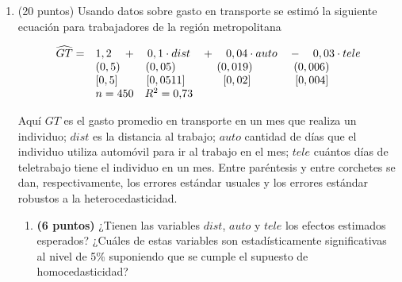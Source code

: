 \documentclass[10pt,a4paper]{article}
\begin{document}
\begin{enumerate}
\begin{enumerate}
   donde L(pib,1) representa el rezago de orden 1 del PIB. Utilizando estos resultados y los valores críticos apropiados del test Dickey--Fuller al 5\% de significancia, determine si existe raíz unitaria en el PIB real de Chile. 


{\color{blue}  El valor del estadístico t para el rezago del PIB real es:

$$t_{DF}={-0.5208\over 0.1777}=-2.931$$ 

Considerando que se cuenta con 25 observaciones, el valor crítico de la tabla al 5\% y con tendencia es -3.6. Luego, como 2.931<3.6, no se rechaza la hipótesis nula. El PIB real presenta una raíz unitaria.   }

   
\end{enumerate}




    \item (20 puntos)  Usando datos sobre gasto en transporte se estimó la siguiente ecuación para trabajadores de la región metropolitana


{\scriptsize
\begin{equation*}
\begin{array}{ll}
\widehat{GT} = & 1,2 \quad + \quad0,1 \cdot dist\quad + \quad 0,04 \cdot auto \quad - \quad 0,03 \cdot tele
 \\
& (0,5)  \hspace{0,8cm} (0,05) \hspace{1,3cm} (0,019) \hspace{1,3cm} (0,006)\\ 
& [0,5]  \hspace{0,9cm} [0,0511] \hspace{1,2cm} [0,02] \hspace{1,4cm}  [0,004] \\
& n = \text{450} \quad R^2 = \text{0,73}
\end{array}
\end{equation*}}



Aquí $GT$ es el gasto promedio en transporte en un mes que realiza un individuo; $dist$ es la distancia al trabajo; $auto$ cantidad de días que el individuo utiliza automóvil para ir al trabajo en el mes; $tele$ cuántos días de teletrabajo tiene el individuo en un mes. Entre paréntesis y entre corchetes se dan, respectivamente,
los errores estándar usuales y los errores estándar robustos a la heterocedasticidad.


\begin{enumerate}
    \item \textbf{(6 puntos)} ¿Tienen las variables  $dist$, $auto$ y $tele$ los efectos estimados esperados? ¿Cuáles de estas variables son estadísticamente significativas al nivel de 5\% suponiendo que se cumple el supuesto de homocedasticidad?


\end{enumerate}
\end{enumerate}
\end{document}
